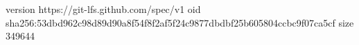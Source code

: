 version https://git-lfs.github.com/spec/v1
oid sha256:53dbd962c98d89d90a8f54f8f2af5f24c9877dbdbf25b605804ccbc9f07ca5cf
size 349644
